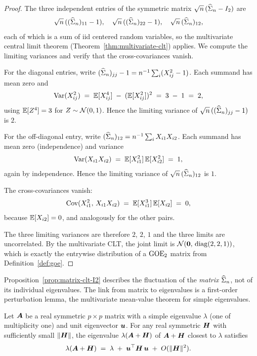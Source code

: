 \begin{proof}
The three independent entries of the symmetric matrix \(\sqrt{n}\,(\widehat{\Sigma}_n - I_2)\) are
\[
  \sqrt{n}\,((\widehat{\Sigma}_n)_{11} - 1), \quad \sqrt{n}\,((\widehat{\Sigma}_n)_{22} - 1), \quad \sqrt{n}\,(\widehat{\Sigma}_n)_{12},
\]
each of which is a sum of iid centered random variables, so the multivariate central limit theorem (Theorem~\ref{thm:multivariate-clt}) applies. We compute the limiting variances and verify that the cross-covariances vanish.

For the diagonal entries, write \((\widehat{\Sigma}_n)_{jj} - 1 = n^{-1} \sum_i (X_{ij}^2 - 1)\). Each summand has mean zero and
\[
  \operatorname{Var}(X_{ij}^2) \;=\; \mathbb{E}[X_{ij}^4] \;-\; (\mathbb{E}[X_{ij}^2])^2 \;=\; 3 \;-\; 1 \;=\; 2,
\]
using \(\mathbb{E}[Z^4] = 3\) for \(Z \sim \mathcal{N}(0, 1)\). Hence the limiting variance of \(\sqrt{n}\,((\widehat{\Sigma}_n)_{jj} - 1)\) is \(2\).

For the off-diagonal entry, write \((\widehat{\Sigma}_n)_{12} = n^{-1} \sum_i X_{i1} X_{i2}\). Each summand has mean zero (independence) and variance
\[
  \operatorname{Var}(X_{i1} X_{i2}) \;=\; \mathbb{E}[X_{i1}^2]\, \mathbb{E}[X_{i2}^2] \;=\; 1,
\]
again by independence. Hence the limiting variance of \(\sqrt{n}\,(\widehat{\Sigma}_n)_{12}\) is \(1\).

The cross-covariances vanish:
\[
  \operatorname{Cov}(X_{i1}^2,\, X_{i1} X_{i2}) \;=\; \mathbb{E}[X_{i1}^3]\, \mathbb{E}[X_{i2}] \;=\; 0,
\]
because \(\mathbb{E}[X_{i2}] = 0\), and analogously for the other pairs.

The three limiting variances are therefore \(2\), \(2\), \(1\) and the three limits are uncorrelated. By the multivariate CLT, the joint limit is \(\mathcal{N}(\bm{0},\, \operatorname{diag}(2, 2, 1))\), which is exactly the entrywise distribution of a \(\mathrm{GOE}_2\) matrix from Definition~\ref{def:goe}.
\end{proof}

Proposition~\ref{prop:matrix-clt-I2} describes the fluctuation of the \emph{matrix} \(\widehat{\Sigma}_n\), not of its individual eigenvalues. The link from matrix to eigenvalues is a first-order perturbation lemma, the multivariate mean-value theorem for simple eigenvalues.

\begin{lemma}\label{lem:first-order-perturbation}
Let \(\bm{A}\) be a real symmetric \(p \times p\) matrix with a simple eigenvalue \(\lambda\) (one of multiplicity one) and unit eigenvector \(\bm{u}\). For any real symmetric \(\bm{H}\) with sufficiently small \(\lVert\bm{H}\rVert\), the eigenvalue \(\lambda(\bm{A} + \bm{H})\) of \(\bm{A} + \bm{H}\) closest to \(\lambda\) satisfies
\[
  \lambda(\bm{A} + \bm{H}) \;=\; \lambda \;+\; \bm{u}^{\top} \bm{H}\, \bm{u} \;+\; O(\lVert\bm{H}\rVert^2).
\]
\end{lemma}

